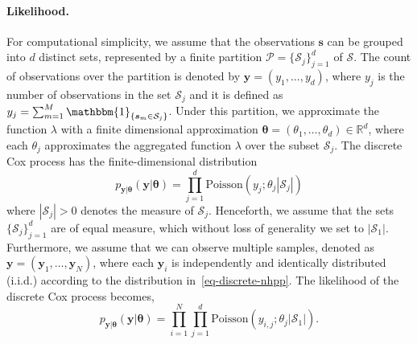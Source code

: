 \paragraph{Likelihood.}
For computational simplicity, we assume that the observations $\mathbf{s}$ can be grouped into $d$ distinct sets, represented by a finite partition $\mathcal{P} = \{\mathcal{S}_{j}\}_{j=1}^{d}$ of $\mathcal{S}$. The count of observations over the partition is denoted by $\boldsymbol{y} = (y_{1},\ldots, y_{d})$, where $y_{j}$ is the number of observations in the set $\mathcal{S}_{j}$ and it is defined as $y_{j} = \sum_{m=1}^{M} \mathbbm{1}_{\{\boldsymbol{s}_{m}\in\mathcal{S}_{j}\}}$. Under this partition, we approximate the function $\lambda$ with a finite dimensional approximation $\boldsymbol{\theta}= (\theta_{1},\ldots,\theta_{d})\in\mathbb{R}^{d}$, where each $\theta_{j}$ approximates the aggregated function $\lambda$ over the subset $\mathcal{S}_{j}$. The discrete Cox process has the finite-dimensional distribution 
\begin{equation}
\label{eq-discrete-nhpp}
   p_{\boldsymbol{y}\vert \boldsymbol{\theta}}(\boldsymbol{y}|\boldsymbol{\theta})=\prod_{j=1}^{d} \text{Poisson}\left(y_{j};\theta_{j}|\mathcal{S}_{j}|\right)
\end{equation}
where $|\mathcal{S}_{j}|>0$ denotes the measure of $\mathcal{S}_{j}$. 
Henceforth, we assume that the sets $\{\mathcal{S}_j\}_{j=1}^d$ are of equal measure, which without loss of generality we set to $|\mathcal{S}_1|$. Furthermore, we assume that we can observe multiple samples, denoted as $\mathbf{y} = (\boldsymbol{y}_1, \ldots, \boldsymbol{y}_N)$, where each 
$\boldsymbol{y}_i$ is independently and identically distributed (i.i.d.) according to the distribution in~\eqref{eq-discrete-nhpp}. The likelihood of the discrete Cox process becomes, 
\begin{equation*}
   p_{\mathbf{y}\vert \boldsymbol{\theta}}(\mathbf{y}|\boldsymbol{\theta})=\prod_{i=1}^{N}\prod_{j=1}^{d} \text{Poisson}\left(y_{i,j};\theta_{j}|\mathcal{S}_{1}|\right).
\end{equation*}

